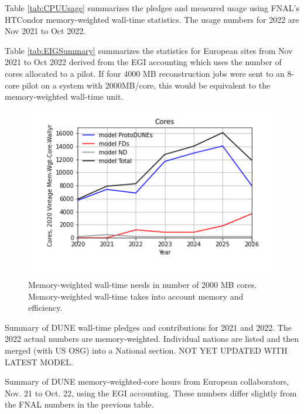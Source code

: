 \documentclass[12pt]{article}
\begin{document}
Table \ref{tab:CPUUsage} summarizes the pledges\cite{CCB2022} and measured usage using FNAL's  HTCondor memory-weighted wall-time statistics\cite{fifemonDUNE}.  The  usage numbers for 2022 are Nov 2021 to Oct 2022. 

Table \ref{tab:EIGSummary} summarizes the statistics for European sites from Nov 2021 to Oct 2022 derived from the EGI accounting\cite{EGI2022} which uses the number of cores allocated to a pilot.   If four 4000 MB reconstruction jobs were sent to an 8-core pilot on a system with 2000MB/core, this would be equivalent to the memory-weighted wall-time unit.   

\begin{figure}[h]
\centering\includegraphics[height=0.4\textwidth]{Parameters_2022-11-21-2026/Parameters_2022-11-21-2026-Cores.png}
\caption{Memory-weighted wall-time needs in number of 2000 MB cores. Memory-weighted  wall-time takes into account memory and efficiency.}\label{fig:CoresMain}
\end{figure}

\begin{table}[ht]
\centering{}
\caption{Summary  of DUNE wall-time pledges and contributions for 2021 and 2022.  The 2022 actual numbers are memory-weighted.  Individual nations are listed and then merged (with US OSG) into a National section. NOT YET UPDATED WITH LATEST MODEL.} 
\label{tab:CPUUsage}
\end{table}

\begin{table}[ht]
\centering{}
\caption{Summary  of DUNE memory-weighted-core hours from European collaborators, Nov. 21 to Oct. 22, using the EGI accounting\cite{EGI2022}. These numbers differ slightly from the FNAL numbers in the previous table.} \label{tab:EIGSummary}
\end{table}
\end{document}
